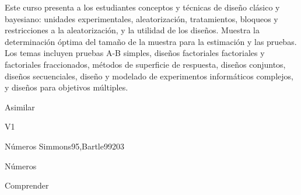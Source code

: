 \begin{syllabus}


\begin{justification}
Este curso presenta a los estudiantes conceptos y técnicas de diseño clásico y bayesiano: unidades experimentales, aleatorización, tratamientos, bloqueos y restricciones a la aleatorización, y la utilidad de los diseños. Muestra  la determinación óptima del tamaño de la muestra para la estimación y las pruebas. Los temas incluyen pruebas A-B simples, diseños factoriales factoriales y factoriales fraccionados, métodos de superficie de respuesta, diseños conjuntos, diseños secuenciales, diseño y modelado de experimentos informáticos complejos, y diseños para objetivos múltiples. 
\end{justification}

\begin{goals}
\item Asimilar
\end{goals}

\begin{outcomes}{V1}
   \item {}
   \item {}
   \item {}
\end{outcomes}

\begin{unit}{Números }{}{Simmons95,Bartle99}{20}{3}
   \begin{topics}
      \item Números 
   \end{topics}

   \begin{learningoutcomes}
      \item Comprender 
      \end{learningoutcomes}
\end{unit}

\begin{coursebibliography}
\end{coursebibliography}

\end{syllabus}

